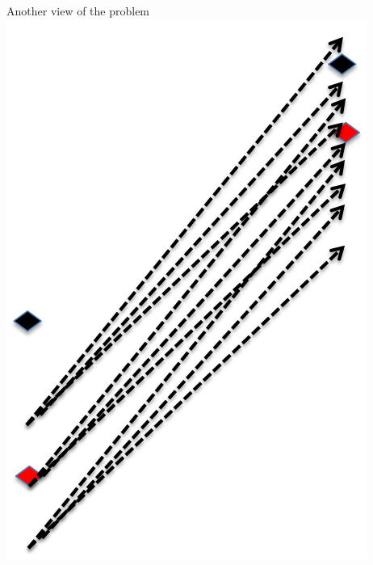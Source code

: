 \documentclass[12pt,a4paper,t,xcolor=dvipsnames,slidestop,compress,mathserif]{beamer}
\begin{document}
\begin{frame}{Another view of the problem}
\includegraphics[scale=0.3]{fwd_sampling_graphic3.png}
\phantom{00000000000000l}
\pause

\end{frame}
\end{document}
